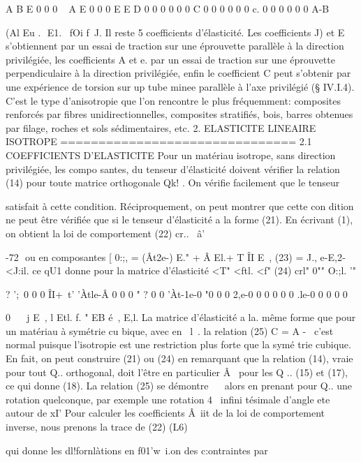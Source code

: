A  B  E  0  0  0  
~  A  E  0  0  0  
E  E D  0  0  0  
0  0  0  C  0  0  
0  0  0  0  c.  0  
0  0  0  0  0  A-B  

(Al 
Eu .  
E1.~ 
fOi 
f~J. 
Il reste 5 coefficients d'élasticité. Les coefficients J) et E s'obtiennent par un essai de traction sur une éprouvette parallèle à la direction privilé­giée, les coefficients A et e. par un essai de traction sur une éprouvette perpendiculaire à la direction privilégiée, enfin le coefficient C peut s'ob­tenir par une expérience de torsion sur up tube minee parallèle à l'axe pri­vilégié (§ IV.I.4). C'est le type d'anisotropie que l'on rencontre le plus fréquemment: composites renforcés par fibres unidirectionnelles, composites stratifiés, bois, barres obtenues par filage, roches et sols sédimentaires, etc. 
2. ELASTICITE LINEAIRE ISOTROPE 
=============================== 
2.1 COEFFICIENTS D'ELASTICITE 
Pour un matériau isotrope, sans direction privilégiée, les compo­
santes, du tenseur d'élasticité doivent vérifier la relation (14) pour toute matrice orthogonale Qk! . On vérifie facilement que le tenseur 

satisfait à cette condition. Réciproquement, on peut montrer que cette con­
dition ne peut être vérifiée que si le tenseur d'élasticité a la forme (21). En écrivant (1), on obtient la loi de comportement 
(22) cr.. 
~â' 

-72 ­
ou en composantes 
[ 
0:;, = (Ât2e-) E." + Â El.+ T ÎI E~,
(23) 
= J., e-E,2­
<J:il. ce qU1 donne pour la matrice d'élasticité 
<T" 
<ftl. <f"
(24) 
crl" 
0"" O:;l. 
'" 

? ';\ 0 0 0
ÎI+~t'­
'Àtle-Â 0 0 0
" ? 0 0
'Àt-1e-0
"0 
0 0 2,e-0 0 
0 0 0 0 .le-0 
0 0 0 0

0 ~~ j 
E~, l
Etl. 
f. " 
EB 
é~, 
E,l. 
La matrice d'élasticité a la. même forme que pour un matériau à symétrie cu­
bique, avec en ~l~. la relation 
(25) C = A -~ 
c'est normal puisque l'isotropie est une restriction plus forte que la symé­
trie cubique. En fait, on peut construire (21) ou (24) en remarquant que la relation (14), vraie pour tout Q.. orthogonal, doit l'être en particulier
Â~ 
pour les Q .. (15) et (17), ce qui donne (18). La relation (25) se démontre 
~~ 
alors en prenant pour Q.. une rotation quelconque, par exemple une rotation 
4~ 
infini tésimale d'angle ete autour de xI' 
Pour calculer les coefficients Â~iit de la loi de comportement inverse, nous prenons la trace de (22) 
(L6) 

qui donne les dl!fornlàtions en f01'w~i.on des c:ontraintes par 

